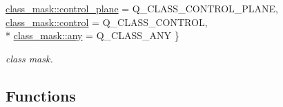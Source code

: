 \begin{DoxyCompactItemize}
\hyperlink{namespacepfq_a96af1f5ed530eff563eb917516758fbba1ed75f78f4a1cf2529490db57b294978}{class\+\_\+mask\+::control\+\_\+plane} = Q\+\_\+\+C\+L\+A\+S\+S\+\_\+\+C\+O\+N\+T\+R\+O\+L\+\_\+\+P\+L\+A\+N\+E, 
\hyperlink{namespacepfq_a96af1f5ed530eff563eb917516758fbbafc5364bf9dbfa34954526becad136d4b}{class\+\_\+mask\+::control} = Q\+\_\+\+C\+L\+A\+S\+S\+\_\+\+C\+O\+N\+T\+R\+O\+L, 
\\*
\hyperlink{namespacepfq_a96af1f5ed530eff563eb917516758fbba100b8cad7cf2a56f6df78f171f97a1ec}{class\+\_\+mask\+::any} = Q\+\_\+\+C\+L\+A\+S\+S\+\_\+\+A\+N\+Y
 \}
\begin{DoxyCompactList}\small\item\em class mask. \end{DoxyCompactList}\end{DoxyCompactItemize}
\subsection*{Functions}
